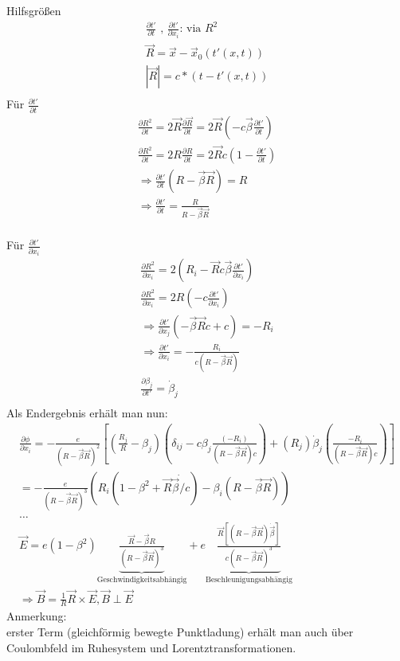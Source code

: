 \documentclass[a4paper]{article}
\begin{document}
Hilfsgrößen
\begin{align}
\frac{\partial t'}{\partial t} \text{ , } \frac{\partial t'}{\partial
x_i}\text{: via }R^2\\
\vec{R}=\vec{x}-\vec{x}_0(t'(x,t))\\
|\vec{R}|=c*\left(t-t'(x,t)\right)\\
\end{align}
Für $\frac{\partial t'}{\partial t}$
\begin{align}
\frac{\partial R^2}{\partial t}=2\vec{R}\frac{\partial \vec{R}}{\partial
t}=2\vec{R}\left(-c\vec{\beta}\frac{\partial t'}{\partial t}\right)\\
\frac{\partial R^2}{\partial t}=2R\frac{\partial R}{\partial
t}=2\vec{R}c\left(1-\frac{\partial t'}{\partial t}\right)\\
\Rightarrow \frac{\partial t'}{\partial t}\left( R-\vec{\beta}\vec{R}
\right)=R\\
\Rightarrow \frac{\partial t'}{\partial t}=\frac{R}{R-\vec{\beta}\vec{R}}\\
\end{align}

Für $\frac{\partial t'}{\partial x_i}$
\begin{align}
\frac{\partial R^2}{\partial
x_i}=2\left(R_i-\vec{R}c\vec{\beta}\frac{\partial t'}{\partial x_i}\right)\\
\frac{\partial R^2}{\partial x_i}=2R\left(-c\frac{\partial t'}{\partial
x_i}\right)\\
\Rightarrow \frac{\partial t'}{\partial x_j}\left(-\vec{\beta}\vec{R}c
+c\right)=-R_i\\
\Rightarrow \frac{\partial t'}{\partial
x_i}=-\frac{R_i}{c(R-\vec{\beta}\vec{R})}\\
\frac{\partial \beta_j}{\partial t'}=\dot{\beta}_j\\
\end{align}
Als Endergebnis erhält man nun:
\begin{align}
\frac{\partial\phi}{\partial x_i}=-\frac{e}{(R-\vec{\beta}\vec{R})^2}\left[
\left( \frac{R_j}{R}-\beta_j \right)\left( \delta_{ij}-c\beta_j
\frac{(-R_i)}{(R-\vec{\beta}\vec{R})c} \right)+(R_j)\dot{\beta}_j\left(
\frac{-R_i}{(R-\vec{\beta}\vec{R})c} \right) \right]\\
=-\frac{e}{(R-\vec{\beta}\vec{R})^3}\left(
R_i(1-\beta^2+\vec{R}\dot{\vec{\beta}/c})-\beta_i(R-\vec{\beta}\vec{R})
\right)\\
\ldots\\
\vec{E}=e(1-\beta^2)\underbrace{\frac{\vec{R}-\vec{\beta}R}{(R-\vec{\beta}
\vec{R})^3}}_{\text{Geschwindigkeitsabhängig}}+
e\underbrace{\frac{\vec{R}[(R-\vec{\beta}\vec{R})\dot{\vec{\beta}}]}{c
(R-\vec{\beta}\vec{R})^3}}_{\text{Beschleunigungsabhängig}}\\
\Rightarrow \vec{B}=\frac{1}{R}\vec{R}\times\vec{E}, \vec{B}\perp\vec{E}
\end{align}
Anmerkung:\\
erster Term (gleichförmig bewegte Punktladung) erhält man auch über
Coulombfeld im Ruhesystem und Lorentztransformationen.
\end{document}
